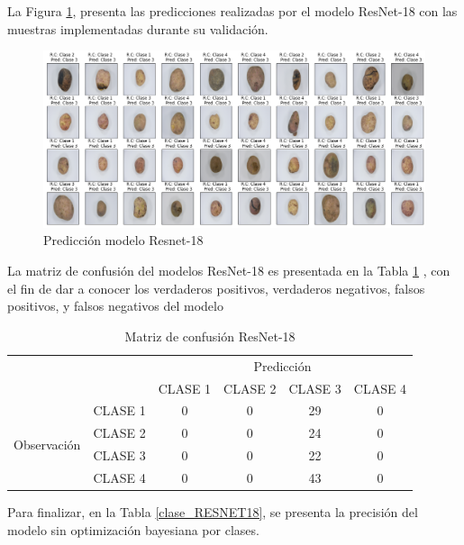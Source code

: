 	\newpage
	La Figura \ref{fig:pre_RESNET18}, presenta las predicciones realizadas por el modelo ResNet-18 con las muestras implementadas durante su validación.
	
	\begin{figure}[ht]
		\centering
		\includegraphics[scale=0.4]{Figs/111.png}
		\caption{Predicción modelo Resnet-18}
		\label{fig:pre_RESNET18}
	\end{figure}

	La matriz de confusión del modelos ResNet-18 es presentada en la Tabla \ref*{MC_RESNET18} , con el fin de dar a conocer los verdaderos positivos, verdaderos negativos, falsos positivos, y falsos negativos del modelo

	\begin{table}[htbp]
		\centering
		\begin{tabular}{|c|l|c|c|c|c|}
			\hline
			\multicolumn{2}{|c|}{\multirow{2}[4]{*}{}} & \multicolumn{4}{c|}{Predicción} \bigstrut\\
			\cline{3-6}    \multicolumn{2}{|c|}{} & CLASE 1 & CLASE 2 & CLASE 3 & CLASE 4 \bigstrut\\
			\hline
			\multirow{4}[8]{*}{\begin{sideways}Observación\end{sideways}} & CLASE 1 & 0     & 0     & 29    & 0 \bigstrut\\
			\cline{2-6}          & CLASE 2 & 0     & 0     & 24    & 0 \bigstrut\\
			\cline{2-6}          & CLASE 3 & 0     & 0     & 22    & 0 \bigstrut\\
			\cline{2-6}          & CLASE 4 & 0     & 0     & 43    & 0 \bigstrut\\
			\hline
		\end{tabular}%
		\caption{Matriz de confusión ResNet-18}
		\label{MC_RESNET18}
	\end{table}%
	
	Para finalizar, en la Tabla \ref*{clase_RESNET18}, se presenta la precisión del modelo sin optimización bayesiana por clases.
	
